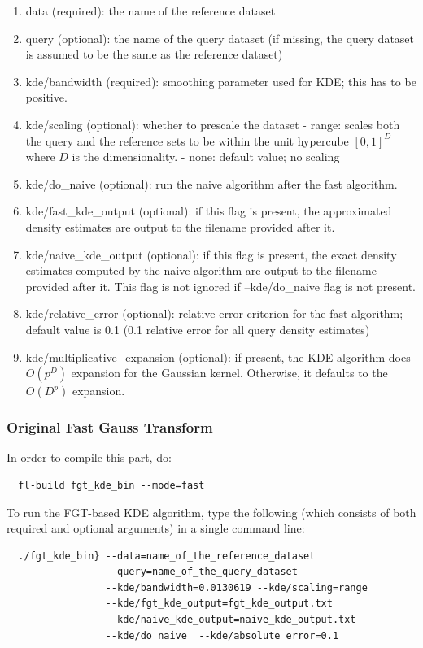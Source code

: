\documentclass[letter]{report}
\begin{document}
\begin{enumerate}
\item{data (required): the name of the reference dataset}
\item{query (optional): the name of the query dataset (if missing, the
 query dataset is assumed to be the same as the reference dataset)}
\item{kde/bandwidth (required): smoothing parameter used for KDE; this
 has to be positive.}
\item{kde/scaling (optional): whether to prescale the dataset - range:
scales both the query and the reference sets to be within the unit
hypercube $[0, 1]^D$ where $D$ is the dimensionality.  - none: default
value; no scaling}
\item{kde/do\_naive (optional): run the naive algorithm after the fast
algorithm.}
\item{kde/fast\_kde\_output (optional): if this flag is present, the
approximated density estimates are output to the filename provided
after it.}
\item{kde/naive\_kde\_output (optional): if this flag is present, the
 exact density estimates computed by the naive algorithm are output to
 the filename provided after it. This flag is not ignored if
 --kde/do\_naive flag is not present.}
\item{kde/relative\_error (optional): relative error criterion for the
 fast algorithm; default value is 0.1 (0.1 relative error for all
 query density estimates)}
\item{kde/multiplicative\_expansion (optional): if present, the KDE
algorithm does $O(p^D)$ expansion for the Gaussian kernel. Otherwise,
it defaults to the $O(D^p)$ expansion.}
\end{enumerate}

\subsubsection{Original Fast Gauss Transform}
In order to compile this part, do: 
\begin{verbatim}
  fl-build fgt_kde_bin --mode=fast
\end{verbatim}

 To run the FGT-based KDE algorithm, type the
following (which consists of both required and optional arguments) in
a single command line:
\begin{verbatim}
  ./fgt_kde_bin} --data=name_of_the_reference_dataset
                 --query=name_of_the_query_dataset
                 --kde/bandwidth=0.0130619 --kde/scaling=range
                 --kde/fgt_kde_output=fgt_kde_output.txt
                 --kde/naive_kde_output=naive_kde_output.txt
                 --kde/do_naive  --kde/absolute_error=0.1
\end{verbatim}
\end{document}
